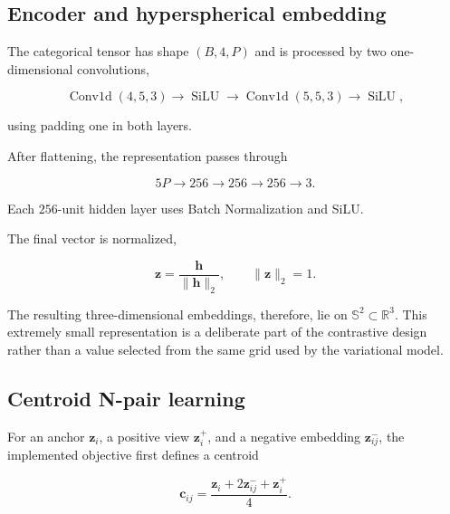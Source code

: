\subsection{Encoder and hyperspherical embedding}

The categorical tensor has shape $(B,4,P)$ and is processed by two
one-dimensional convolutions,

\begin{equation}
\operatorname{Conv1d}(4,5,3)
\rightarrow
\operatorname{SiLU}
\rightarrow
\operatorname{Conv1d}(5,5,3)
\rightarrow
\operatorname{SiLU},
\end{equation}

using padding one in both layers.

After flattening, the representation passes through

\begin{equation}
    5P
    \rightarrow
    256
    \rightarrow
    256
    \rightarrow
    256
    \rightarrow
    3.
\end{equation}

Each $256$-unit hidden layer uses Batch Normalization and SiLU.

The final vector is normalized,

\begin{equation}
    \mathbf{z}
    =
    \frac{\mathbf{h}}{\|\mathbf{h}\|_2},
    \qquad
    \|\mathbf{z}\|_2=1.
    \label{eq:hyperspherical_normalization}
\end{equation}

The resulting three-dimensional embeddings, therefore, lie on
$\mathbb{S}^{2}\subset\mathbb{R}^{3}$. This extremely small
representation is a deliberate part of the contrastive design rather
than a value selected from the same grid used by the variational
model.

\subsection{Centroid N-pair learning}

For an anchor $\mathbf{z}_i$, a positive view $\mathbf{z}_i^{+}$, and
a negative embedding $\mathbf{z}_{ij}^{-}$, the implemented objective
first defines a centroid

\begin{equation}
    \mathbf{c}_{ij}
    =
    \frac{
        \mathbf{z}_i
        +
        2\mathbf{z}_{ij}^{-}
        +
        \mathbf{z}_i^{+}
    }{4}.
\end{equation}

